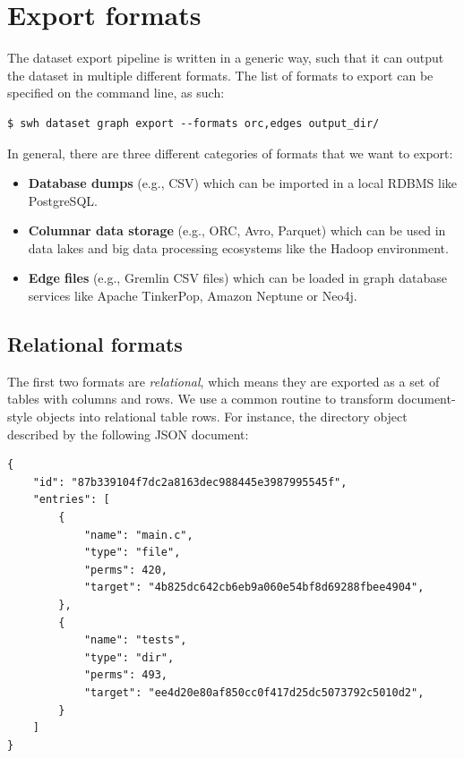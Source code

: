 \section{Export formats}

The dataset export pipeline is written in a generic way, such that it can
output the dataset in multiple different formats. The list of formats to export
can be specified on the command line, as such:

\begin{verbatim}
$ swh dataset graph export --formats orc,edges output_dir/
\end{verbatim}

In general, there are three different categories of formats that we want to
export:

\begin{itemize}
    \item \textbf{Database dumps} (e.g., CSV) which can be imported in a local
        \gls{RDBMS} like PostgreSQL\@.
    \item \textbf{Columnar data storage} (e.g., ORC, Avro, Parquet) which can
        be used in data lakes and big data processing ecosystems like the
        Hadoop environment.
    \item \textbf{Edge files} (e.g., Gremlin CSV files) which can
        be loaded in graph database services like Apache TinkerPop, Amazon
        Neptune or Neo4j.
\end{itemize}

\subsection{Relational formats}
The first two formats are \emph{relational}, which means they are exported as a
set of tables with columns and rows. We use a common routine to transform
document-style objects into relational table rows. For instance, the directory
object described by the following JSON document:

{\footnotesize
\begin{verbatim}
{
    "id": "87b339104f7dc2a8163dec988445e3987995545f",
    "entries": [
        {
            "name": "main.c",
            "type": "file",
            "perms": 420,
            "target": "4b825dc642cb6eb9a060e54bf8d69288fbee4904",
        },
        {
            "name": "tests",
            "type": "dir",
            "perms": 493,
            "target": "ee4d20e80af850cc0f417d25dc5073792c5010d2",
        }
    ]
}
\end{verbatim}
}

